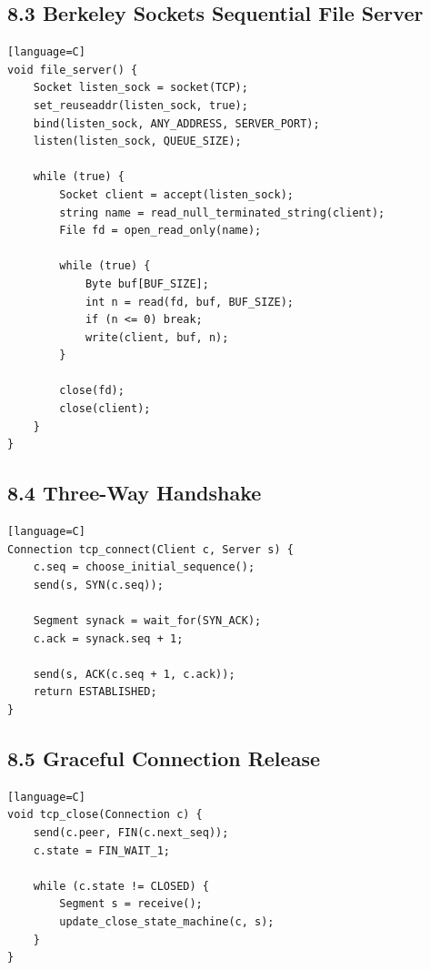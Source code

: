\documentclass[11pt]{article}
\begin{document}
\subsection{8.3 Berkeley Sockets Sequential File
Server}\label{berkeley-sockets-sequential-file-server}

\begin{verbatim}[language=C]
void file_server() {
    Socket listen_sock = socket(TCP);
    set_reuseaddr(listen_sock, true);
    bind(listen_sock, ANY_ADDRESS, SERVER_PORT);
    listen(listen_sock, QUEUE_SIZE);

    while (true) {
        Socket client = accept(listen_sock);
        string name = read_null_terminated_string(client);
        File fd = open_read_only(name);

        while (true) {
            Byte buf[BUF_SIZE];
            int n = read(fd, buf, BUF_SIZE);
            if (n <= 0) break;
            write(client, buf, n);
        }

        close(fd);
        close(client);
    }
}
\end{verbatim}

\subsection{8.4 Three-Way Handshake}\label{three-way-handshake}

\begin{verbatim}[language=C]
Connection tcp_connect(Client c, Server s) {
    c.seq = choose_initial_sequence();
    send(s, SYN(c.seq));

    Segment synack = wait_for(SYN_ACK);
    c.ack = synack.seq + 1;

    send(s, ACK(c.seq + 1, c.ack));
    return ESTABLISHED;
}
\end{verbatim}

\subsection{8.5 Graceful Connection
Release}\label{graceful-connection-release}

\begin{verbatim}[language=C]
void tcp_close(Connection c) {
    send(c.peer, FIN(c.next_seq));
    c.state = FIN_WAIT_1;

    while (c.state != CLOSED) {
        Segment s = receive();
        update_close_state_machine(c, s);
    }
}
\end{verbatim}
\end{document}
